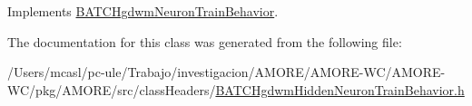 Implements \hyperlink{class_b_a_t_c_hgdwm_neuron_train_behavior_a768783bedb8e82c37614c24d3eebb2df}{BATCHgdwmNeuronTrainBehavior}.



The documentation for this class was generated from the following file:\begin{DoxyCompactItemize}
\item 
/Users/mcasl/pc-\/ule/Trabajo/investigacion/AMORE/AMORE-\/WC/AMORE-\/WC/pkg/AMORE/src/classHeaders/\hyperlink{_b_a_t_c_hgdwm_hidden_neuron_train_behavior_8h}{BATCHgdwmHiddenNeuronTrainBehavior.h}\end{DoxyCompactItemize}
